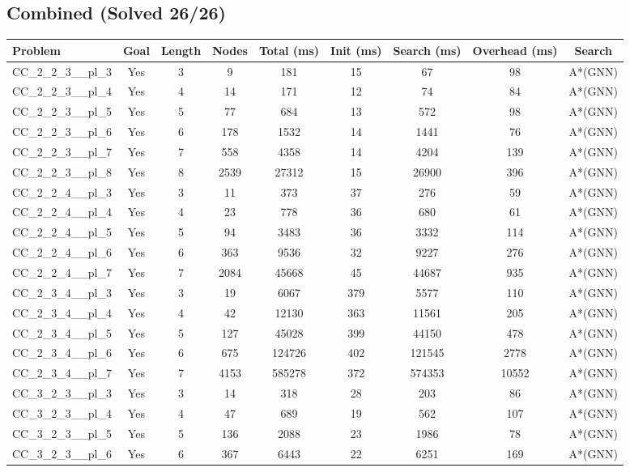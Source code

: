 \documentclass{article}
\begin{document}
\subsection*{Combined (Solved 26/26)}
\begin{tabular}{lcccccccc}
\toprule
Problem & Goal & Length & Nodes & Total (ms) & Init (ms) & Search (ms) & Overhead (ms) & Search \\
\midrule
CC\_2\_2\_3\_\_pl\_3 & Yes & 3 & 9 & 181 & 15 & 67 & 98 & A*(GNN) \\
CC\_2\_2\_3\_\_pl\_4 & Yes & 4 & 14 & 171 & 12 & 74 & 84 & A*(GNN) \\
CC\_2\_2\_3\_\_pl\_5 & Yes & 5 & 77 & 684 & 13 & 572 & 98 & A*(GNN) \\
CC\_2\_2\_3\_\_pl\_6 & Yes & 6 & 178 & 1532 & 14 & 1441 & 76 & A*(GNN) \\
CC\_2\_2\_3\_\_pl\_7 & Yes & 7 & 558 & 4358 & 14 & 4204 & 139 & A*(GNN) \\
CC\_2\_2\_3\_\_pl\_8 & Yes & 8 & 2539 & 27312 & 15 & 26900 & 396 & A*(GNN) \\
CC\_2\_2\_4\_\_pl\_3 & Yes & 3 & 11 & 373 & 37 & 276 & 59 & A*(GNN) \\
CC\_2\_2\_4\_\_pl\_4 & Yes & 4 & 23 & 778 & 36 & 680 & 61 & A*(GNN) \\
CC\_2\_2\_4\_\_pl\_5 & Yes & 5 & 94 & 3483 & 36 & 3332 & 114 & A*(GNN) \\
CC\_2\_2\_4\_\_pl\_6 & Yes & 6 & 363 & 9536 & 32 & 9227 & 276 & A*(GNN) \\
CC\_2\_2\_4\_\_pl\_7 & Yes & 7 & 2084 & 45668 & 45 & 44687 & 935 & A*(GNN) \\
CC\_2\_3\_4\_\_pl\_3 & Yes & 3 & 19 & 6067 & 379 & 5577 & 110 & A*(GNN) \\
CC\_2\_3\_4\_\_pl\_4 & Yes & 4 & 42 & 12130 & 363 & 11561 & 205 & A*(GNN) \\
CC\_2\_3\_4\_\_pl\_5 & Yes & 5 & 127 & 45028 & 399 & 44150 & 478 & A*(GNN) \\
CC\_2\_3\_4\_\_pl\_6 & Yes & 6 & 675 & 124726 & 402 & 121545 & 2778 & A*(GNN) \\
CC\_2\_3\_4\_\_pl\_7 & Yes & 7 & 4153 & 585278 & 372 & 574353 & 10552 & A*(GNN) \\
CC\_3\_2\_3\_\_pl\_3 & Yes & 3 & 14 & 318 & 28 & 203 & 86 & A*(GNN) \\
CC\_3\_2\_3\_\_pl\_4 & Yes & 4 & 47 & 689 & 19 & 562 & 107 & A*(GNN) \\
CC\_3\_2\_3\_\_pl\_5 & Yes & 5 & 136 & 2088 & 23 & 1986 & 78 & A*(GNN) \\
CC\_3\_2\_3\_\_pl\_6 & Yes & 6 & 367 & 6443 & 22 & 6251 & 169 & A*(GNN) \\

\end{tabular}
\end{document}
